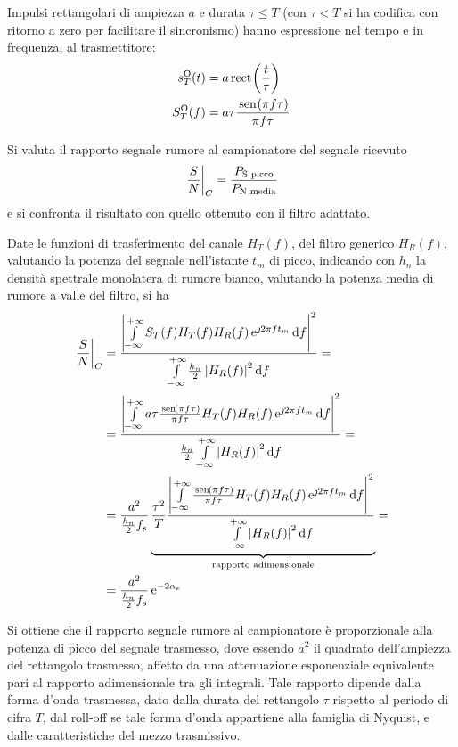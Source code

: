 Impulsi rettangolari di ampiezza $a$ e durata $\tau\leq T$ (con $\tau<T$ si ha codifica con ritorno a zero per facilitare il sincronismo) hanno espressione nel tempo e in frequenza, al trasmettitore:
\begin{equation}
\begin{split}
s_T^\text{O}(t)&=a\,{\operatorname{rect}}^{}\!\left({\frac{t}{\tau}}\right)\\
S_T^\text{O}(f)&=a\tau\frac{\,{\operatorname{sen}}^{}\!\left({\pi f\tau}\right)}{\pi f\tau}
\end{split}
\end{equation}

Si valuta il rapporto segnale rumore al campionatore del segnale ricevuto
\begin{equation}
\left.{\frac{S}{N}}\right\rvert_{C}=\frac{P_\text{S picco}}{P_\text{N media}}
\end{equation}
e si confronta il risultato con quello ottenuto con il filtro adattato.

Date le funzioni di trasferimento del canale $H_T(f)$, del filtro generico $H_R(f)$, valutando la potenza del segnale nell'istante $t_m$ di picco, indicando con $h_n$ la densità spettrale monolatera di rumore bianco, valutando la potenza media di rumore a valle del filtro, si ha
\begin{equation}
\begin{split}
\restrict{\frac{S}{N}}{C}&=\frac{\abs{\intinf{ S_T(f) H_T(f)H_R(f)\e{\jmath 2\pi f t_m}}{f}}^2}{\intinf{\frac{h_n}{2}\abs{H_R(f)}^2}{f}}=\\
&=\frac{\abs{\intinf{ a\tau \frac{\sen{\pi f\tau}}{\pi f\tau} H_T(f)H_R(f)\e{\jmath 2\pi f t_m}}{f}}^2}{\frac{h_n}{2}\intinf{\abs{H_R(f)}^2}{f}}=\\
&=\frac{a^2}{\frac{h_n}{2}f_s}\underbrace{\frac{\tau^2}{T}\frac{\abs{\intinf{\frac{\sen{\pi f\tau}}{\pi f\tau} H_T(f)H_R(f)\e{\jmath 2\pi f t_m}}{f}}^2}{\intinf{\abs{H_R(f)}^2}{f}}}_{\text{rapporto adimensionale}}=\\
&=\frac{a^2}{\frac{h_n}{2}f_s}\e{-2\alpha_e}
\end{split}
\end{equation}

Si ottiene che il rapporto segnale rumore al campionatore è proporzionale alla potenza di picco del segnale trasmesso, dove essendo $a^2$ il quadrato dell'ampiezza del rettangolo trasmesso, affetto da una attenuazione esponenziale equivalente pari al rapporto adimensionale tra gli integrali. Tale rapporto dipende dalla forma d'onda trasmessa, dato dalla durata del rettangolo $\tau$ rispetto al periodo di cifra $T$, dal roll-off se tale forma d'onda appartiene alla famiglia di Nyquist, e dalle caratteristiche del mezzo trasmissivo.

